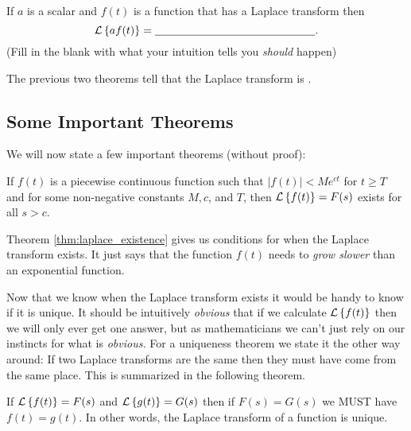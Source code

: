 \begin{thm}
    If $a$ is a scalar and $f(t)$ is a function that has a Laplace
    transform then 
    \[ \mathcal{L}\left\{ af(t) \right\} = \underline{\hspace{2in}}. \]
    (Fill in the blank with what your intuition tells you {\it should} happen)
\end{thm}

\begin{problem}
    The previous two theorems tell that the Laplace transform is
    \underline{\hspace{1in}}.
\end{problem}



\subsection{Some Important Theorems}
We will now state a few important theorems (without proof):

\begin{thm}\label{thm:laplace_existence}
    If $f(t)$ is a piecewise continuous function
    such that $|f(t)|< M e^{ct}$ for $t \ge T$ and for some non-negative constants $M,
    c$, and $T$, then $\mathcal{L}\left\{ f(t) \right\}=F(s)$ exists for all $s > c$.
\end{thm}
Theorem \ref{thm:laplace_existence} gives us conditions for when the Laplace transform
exists.  It just says that the function $f(t)$ needs to {\it grow slower} than an
exponential function. 

Now that we know when the Laplace transform exists it would be handy to know if it is
unique.  It should be intuitively {\it obvious} that if we calculate $\mathcal{L}\left\{ f(t) \right\}$ then we
will only ever get one answer, but as mathematicians we can't just rely on our instincts
for what is {\it obvious.}  For a uniqueness theorem we state it the other way around:  If
two Laplace transforms are the same then they must have come from the same place.  This is
summarized in the following theorem.
\begin{thm}
    If $\mathcal{L}\left\{ f(t) \right\} = F(s)$ and $\mathcal{L}\left\{ g(t) \right\} =
    G(s)$ then if $F(s) = G(s)$ we MUST have $f(t) = g(t)$.  In other words, the
    Laplace transform of a function is unique.
\end{thm}

